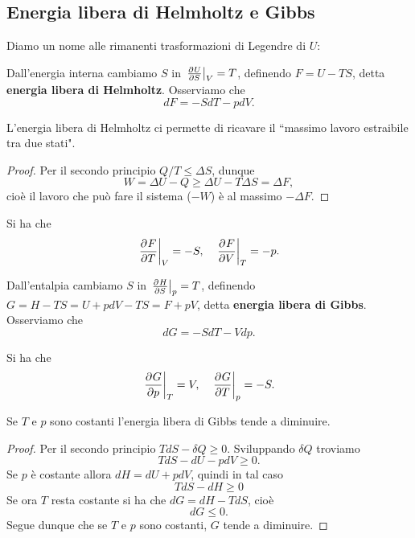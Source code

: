 \subsection{Energia libera di Helmholtz e Gibbs}
\noindent
Diamo un nome alle rimanenti trasformazioni di Legendre di $U$:
\begin{definition}
Dall'energia interna cambiamo $S$ in $\ppb SUV=T$, definendo $F=U-TS$, detta \textbf{energia libera di Helmholtz}. Osserviamo che
\[dF=-SdT-pdV.\]
\end{definition}

\begin{remark}
L'energia libera di Helmholtz ci permette di ricavare il ``massimo lavoro estraibile tra due stati".
\end{remark}
\begin{proof}
Per il secondo principio $Q/T\leq \Delta S$, dunque
\[W=\Delta U-Q\geq \Delta U-T\Delta S=\Delta F,\]
cio\`e il lavoro che pu\`o fare il sistema ($-W$) \`e al massimo $-\Delta F$.
\end{proof}

\begin{remark}
Si ha che
\[\ppb TFV=-S,\quad \ppb VFT=-p.\]
\end{remark}

\begin{definition}
Dall'entalpia cambiamo $S$ in $\ppb SHp=T$, definendo $G=H-TS=U+pdV-TS=F+pV$, detta \textbf{energia libera di Gibbs}. Osserviamo che
\[dG=-SdT-Vdp.\]
\end{definition}

\begin{remark}
Si ha che
\[\ppb pGT=V,\quad \ppb TGp=-S.\]
\end{remark}

\begin{proposition}\label{GibbsDiminuiscePerPressioneETemperaturaCostanti}
Se $T$ e $p$ sono costanti l'energia libera di Gibbs tende a diminuire.
\end{proposition}
\begin{proof}
Per il secondo principio $TdS-\delta Q\geq 0$. Sviluppando $\delta Q$ troviamo
\[TdS-dU-pdV\geq0.\]
Se $p$ \`e costante allora $dH=dU+pdV$, quindi in tal caso
\[TdS-dH\geq 0\]
Se ora $T$ resta costante si ha che $dG=dH-TdS$, cio\`e
\[dG\leq 0.\]
Segue dunque che se $T$ e $p$ sono costanti, $G$ tende a diminuire.
\end{proof}


